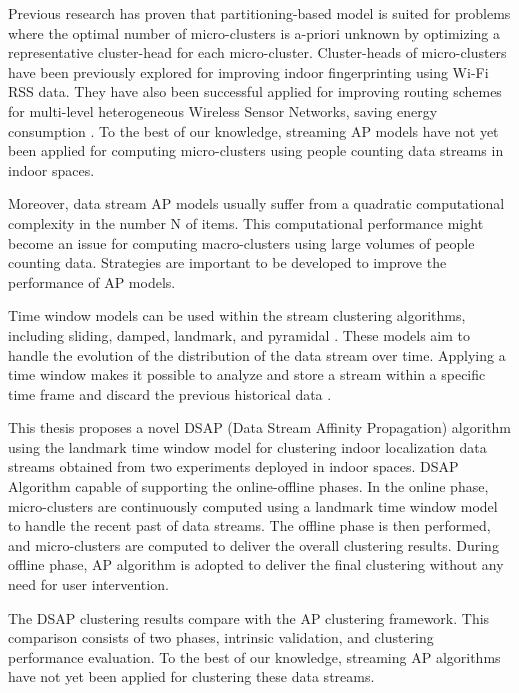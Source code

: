 Previous research has proven that partitioning-based model is suited for problems where the optimal number of micro-clusters is a-priori unknown by optimizing a representative cluster-head for each micro-cluster. Cluster-heads of micro-clusters have been previously explored for improving indoor fingerprinting using Wi-Fi RSS data\cite{hu2015improving, subedi2019improving}. They have also been successful applied for improving routing schemes for multi-level heterogeneous Wireless Sensor Networks, saving energy consumption \cite{wang2019affinity}. To the best of our knowledge,  streaming AP models have not yet been applied for computing micro-clusters using people counting data streams in indoor spaces.  

Moreover, data stream AP models usually suffer from a quadratic computational complexity in the number N of items. %
This computational performance might become an issue for computing macro-clusters using large volumes of people counting data. Strategies are important to be developed to improve the performance of AP models. 

Time window models can be used within the stream clustering algorithms, including sliding, damped, landmark, and pyramidal \cite{nguyen2015survey}. These models aim to handle the evolution of the distribution of the data stream over time. Applying a time window makes it possible to analyze and store a stream within a specific time frame and discard the previous historical data \cite{mansalis2018evaluation}.

This thesis proposes a novel DSAP (Data Stream Affinity Propagation) algorithm using the landmark time window model for clustering indoor localization data streams obtained from two experiments deployed in indoor spaces. DSAP Algorithm capable of supporting the online-offline phases. In the online phase, micro-clusters are continuously computed using a landmark time window model to handle the recent past of data streams. The offline phase is then performed, and micro-clusters are computed to deliver the overall clustering results. During offline phase, AP algorithm is adopted to deliver the final clustering without any need for user intervention.

The DSAP clustering results compare with the AP clustering framework. This comparison consists of two phases, intrinsic validation, and clustering performance evaluation.
To the best of our knowledge, streaming AP algorithms have not yet been applied for clustering these data streams. 

